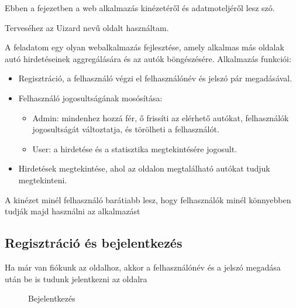 Ebben a fejezetben a web alkalmazás kinézetéről és adatmoteljéről lesz szó.

Terveséhez az Uizard\cite{uizard} nevű oldalt használtam.


A feladatom egy olyan webalkalmazás fejlesztése, amely alkalmas más oldalak autó hirdetéseinek aggregálására és az autók böngészésére. Alkalmazás funkciói:

\begin{itemize}
\item Regisztráció, a felhasználó végzi el felhasználónév és jelszó pár megadásával.
\item Felhasználó jogosultságának mosósítása:
	\begin{itemize}
	\item Admin: mindenhez hozzá fér, ő frissíti az elérhető autókat, felhasználók jogosultságát változtatja, és törölheti a felhasználót.
	\item User: a hirdetése és a statisztika megtekintésére jogosult.
	\end{itemize}
\item Hirdetések megtekintése, ahol az oldalon megtalálható autókat tudjuk megtekinteni.
\end{itemize}


A kinézet minél felhasználó barátiabb lesz, hogy felhasználók minél könnyebben tudják majd használni az alkalmazást

\subsection{Regisztráció és bejelentkezés}

Ha már van fiókunk az oldalhoz, akkor a felhasználónév és a jelszó megadása után be is tudunk jelentkezni az oldalra

\newpage

\begin{figure}[h]
\centering
{}
\caption{Bejelentkezés}
\label{fig:Bejelentkezés}
\end{figure}

